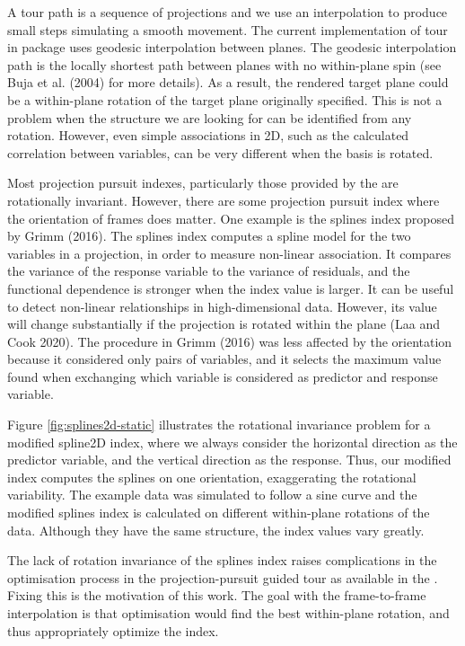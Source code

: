 A tour path is a sequence of projections and we use an interpolation to produce small steps simulating a smooth movement. The current implementation of tour in  package uses geodesic interpolation between planes. The geodesic interpolation path is the locally shortest path between planes with no within-plane spin (see Buja et al. (2004) for more details). As a result, the rendered target plane could be a within-plane rotation of the target plane originally specified. This is not a problem when the structure we are looking for can be identified from any rotation. However, even simple associations in 2D, such as the calculated correlation between variables, can be very different when the basis is rotated.

Most projection pursuit indexes, particularly those provided by the  are rotationally invariant. However, there are some projection pursuit index where the orientation of frames does matter. One example is the splines index proposed by Grimm (2016). The splines index computes a spline model for the two variables in a projection, in order to measure non-linear association. It compares the variance of the response variable to the variance of residuals, and the functional dependence is stronger when the index value is larger. It can be useful to detect non-linear relationships in high-dimensional data. However, its value will change substantially if the projection is rotated within the plane (Laa and Cook 2020). The procedure in Grimm (2016) was less affected by the orientation because it considered only pairs of variables, and it selects the maximum value found when exchanging which variable is considered as predictor and response variable.

Figure \ref{fig:splines2d-static} illustrates the rotational invariance problem for a modified spline2D index, where we always consider the horizontal direction as the predictor variable, and the vertical direction as the response. Thus, our modified index computes the splines on one orientation, exaggerating the rotational variability. The example data was simulated to follow a sine curve and the modified splines index is calculated on different within-plane rotations of the data. Although they have the same structure, the index values vary greatly.

The lack of rotation invariance of the splines index raises complications in the optimisation process in the projection-pursuit guided tour as available in the . Fixing this is the motivation of this work. The goal with the frame-to-frame interpolation is that optimisation would find the best within-plane rotation, and thus appropriately optimize the index.

